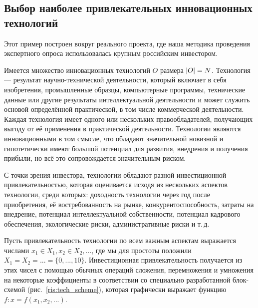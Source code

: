 
\label{sec:examples}
\subsection{Выбор наиболее привлекательных инновационных технологий}

Этот пример построен вокруг реального проекта, где наша методика проведения экспертного опроса использовалась крупным российским инвестором. %

Имеется множество инновационных технологий $O$ размера $\left| O \right| = N$.  Технология --- результат научно-технической деятельности, который включает в себя изобретения, промышленные образцы, компьютерные программы, технические данные или другие результаты интеллектуальной деятельности и может служить основой определённой практической, в том числе коммерческой деятельности. Каждая технология имеет одного или нескольких правообладателей, получающих выгоду от её применения в практической деятельности. Технологии являются инновационными в том смысле, что обладают значительной новизной и гипотетически имеют большой потенциал для развития, внедрения и получения прибыли, но всё это сопровождается значительным риском. 


С точки зрения инвестора, технологии обладают разной инвестиционной привлекательностью, которая оценивается исходя из нескольких аспектов технологии, среди которых: доходность технологии через год после приобретения, её востребованность на рынке, конкурентоспособность, затраты на внедрение, потенциал интеллектуальной собственности, потенциал кадрового обеспечения, экологические риски, административные риски и т.\,д. 

Пусть привлекательность технологии по всем важным аспектам выражается числами $x_1 \in X_1, x_2 \in X_2, ...$, где мы для простоты положили $X_1 = X_2 = ... = \{0, ..., 10\}$. Инвестиционная привлекательность получается из этих чисел с помощью обычных операций сложения, перемножения и умножения на некоторые коэффициенты в соответствии со специально разработанной блок-схемой (рис.~\ref{ris:tech_scheme}), которая графически выражает функцию $f: x = f(x_1, x_2, ...)$. 

